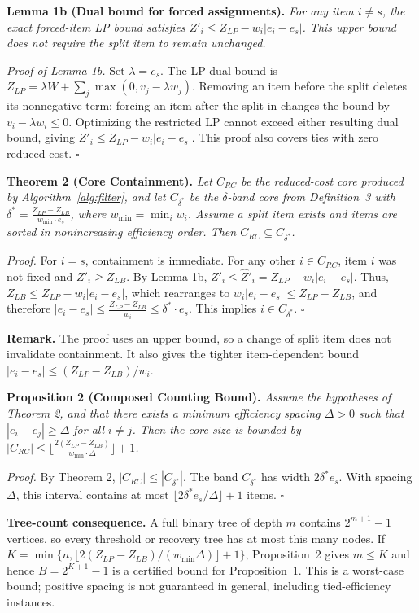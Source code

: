 \documentclass[pdflatex,sn-mathphys-num]{sn-jnl}
\begin{document}
\textbf{Lemma 1b (Dual bound for forced assignments).}\label{lem:monotonicity}
\textit{For any item $i\ne s$, the exact forced-item LP bound satisfies $Z'_i\le Z_{LP}-w_i|e_i-e_s|$. This upper bound does not require the split item to remain unchanged.}

\textit{Proof of Lemma 1b.} Set $\lambda=e_s$. The LP dual bound is
$Z_{LP}=\lambda W+\sum_j\max(0,v_j-\lambda w_j)$.
Removing an item before the split deletes its nonnegative term; forcing an item after the split in changes the bound by $v_i-\lambda w_i\le0$. Optimizing the restricted LP cannot exceed either resulting dual bound, giving $Z'_i\le Z_{LP}-w_i|e_i-e_s|$. This proof also covers ties with zero reduced cost. $\square$

\textbf{Theorem 2 (Core Containment).} \textit{Let $C_{RC}$ be the reduced-cost core produced by Algorithm~\ref{alg:filter}, and let $C_{\delta^*}$ be the $\delta$-band core from Definition~3 with $\delta^* = \frac{Z_{LP} - Z_{LB}}{w_{\min} \cdot e_s}$, where $w_{\min} = \min_{i} w_i$. Assume a split item exists and items are sorted in nonincreasing efficiency order. Then $C_{RC} \subseteq C_{\delta^*}$.}

\textit{Proof.} For $i=s$, containment is immediate. For any other $i \in C_{RC}$, item $i$ was not fixed and $Z'_i \ge Z_{LB}$. By Lemma 1b, $Z'_i \le \hat{Z}'_i = Z_{LP} - w_i |e_i - e_s|$. Thus, $Z_{LB} \le Z_{LP} - w_i |e_i - e_s|$, which rearranges to $w_i |e_i - e_s| \le Z_{LP} - Z_{LB}$, and therefore $|e_i - e_s| \le \frac{Z_{LP} - Z_{LB}}{w_i} \le \delta^* \cdot e_s$. This implies $i \in C_{\delta^*}$. $\square$


\textbf{Remark.} The proof uses an upper bound, so a change of split item does not invalidate containment. It also gives the tighter item-dependent bound $|e_i-e_s|\le(Z_{LP}-Z_{LB})/w_i$.

\textbf{Proposition 2 (Composed Counting Bound).} \textit{Assume the hypotheses of Theorem 2, and that there exists a minimum efficiency spacing $\Delta > 0$ such that $|e_i - e_j| \ge \Delta$ for all $i \ne j$. Then the core size is bounded by $|C_{RC}| \le \lfloor \frac{2(Z_{LP} - Z_{LB})}{w_{\min} \cdot \Delta} \rfloor + 1$.}

\textit{Proof.} By Theorem 2, $|C_{RC}| \le |C_{\delta^*}|$. The band $C_{\delta^*}$ has width $2 \delta^* e_s$. With spacing $\Delta$, this interval contains at most $\lfloor 2\delta^* e_s / \Delta \rfloor + 1$ items. $\square$


\textbf{Tree-count consequence.} A full binary tree of depth $m$ contains $2^{m+1}-1$ vertices, so every threshold or recovery tree has at most this many nodes. If $K=\min\{n,\lfloor 2(Z_{LP}-Z_{LB})/(w_{\min}\Delta)\rfloor+1\}$, Proposition~2 gives $m\le K$ and hence $B=2^{K+1}-1$ is a certified bound for Proposition~1. This is a worst-case bound; positive spacing is not guaranteed in general, including tied-efficiency instances.
\end{document}
